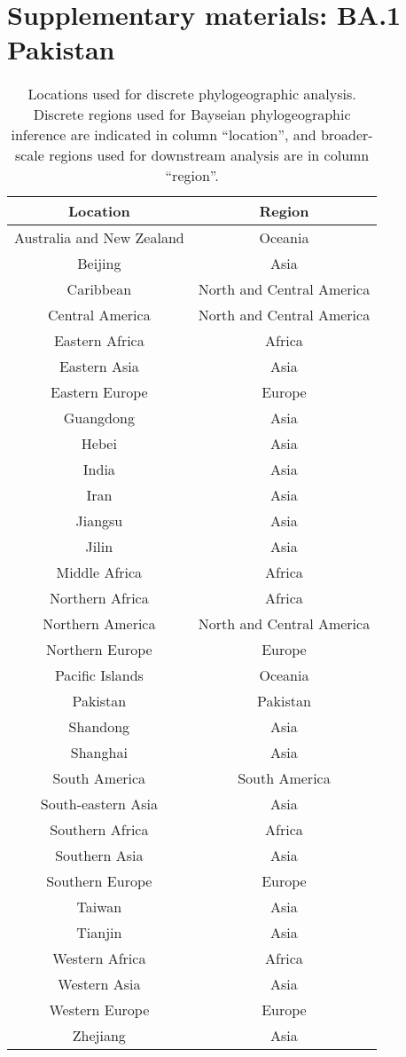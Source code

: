 \chapter{Supplementary materials: BA.1 Pakistan}
\label{appendix_ch2}

\begin{table}[!htbp]
    \centering
    \begin{tabular}{|c|c|}
        \toprule
        Location  &  Region\\
        \midrule   
        Australia and New Zealand & Oceania\\
        Beijing & Asia\\
        Caribbean & North and Central America\\
        Central America & North and Central America\\
        Eastern Africa & Africa\\
        Eastern Asia & Asia\\
        Eastern Europe & Europe\\
        Guangdong & Asia\\
        Hebei & Asia\\
        India & Asia\\
        Iran & Asia\\
        Jiangsu & Asia\\
        Jilin & Asia\\
        Middle Africa & Africa\\
        Northern Africa & Africa\\
        Northern America & North and Central America\\
        Northern Europe & Europe\\
        Pacific Islands & Oceania\\
        Pakistan & Pakistan\\
        Shandong & Asia\\
        Shanghai & Asia\\
        South America & South America\\
        South-eastern Asia & Asia\\
        Southern Africa & Africa\\
        Southern Asia & Asia\\
        Southern Europe & Europe\\
        Taiwan & Asia\\
        Tianjin & Asia\\
        Western Africa & Africa\\
        Western Asia & Asia\\
        Western Europe & Europe\\
        Zhejiang & Asia\\
        \bottomrule
    \end{tabular}
    \caption{Locations used for discrete phylogeographic analysis. Discrete regions used for Bayseian phylogeographic inference are indicated in column ``location'', and broader-scale regions used for downstream analysis are in column ``region''.}
    \label{tab:locations}
\end{table}

